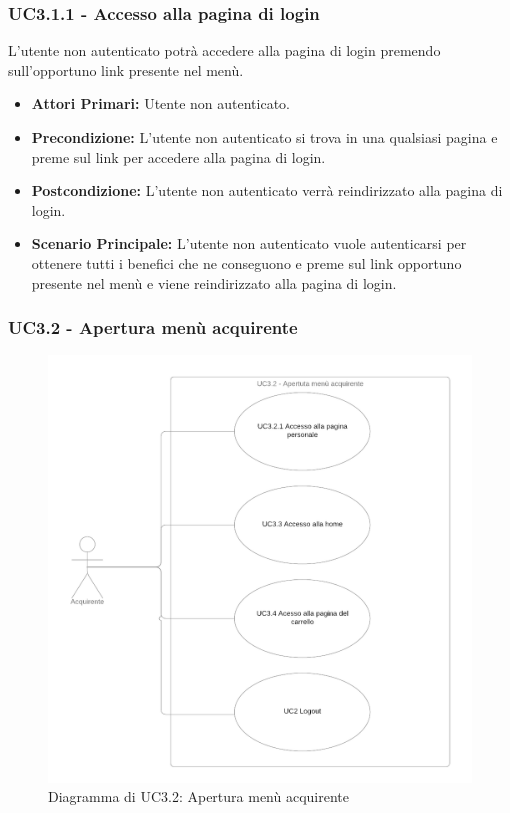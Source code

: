 \subsubsection{UC3.1.1 - Accesso alla pagina di login}\label{UC3.1.1}
L'utente non autenticato potrà accedere alla pagina di login premendo sull'opportuno link presente nel menù.
\begin{itemize}
    \item \textbf{Attori Primari:} Utente non autenticato.
    \item \textbf{Precondizione:} L'utente non autenticato si trova in una qualsiasi pagina e preme sul link per accedere alla pagina di login.
    \item \textbf{Postcondizione:} L'utente non autenticato verrà reindirizzato alla pagina di login.
    \item \textbf{Scenario Principale:} L'utente non autenticato vuole autenticarsi per ottenere tutti i benefici che ne conseguono e preme sul link opportuno presente nel menù e viene reindirizzato alla pagina di login. 
\end{itemize}

\subsubsection{UC3.2 - Apertura menù acquirente} \label{UC3.2}

\begin{figure}[H]
    \centering
    \includegraphics[scale=0.4]{Immagini/DiagrammiUC/UC3.2MenuAcquirente.png}
    \caption{Diagramma di UC3.2: Apertura menù acquirente} 
    \label{fig:MenuUtenteAutenticato}
\end{figure}

